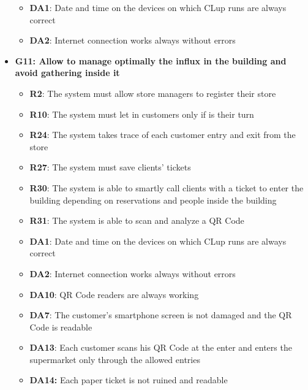 \documentclass{article}
\begin{document}
\begin{itemize}
\begin{itemize}
						\item {\bfseries DA1}: Date and time on the devices on which CLup runs are always correct
						\item {\bfseries DA2}: Internet connection works always without errors
					
					\end{itemize}

				\newpage
				
				\item {\bfseries G11: Allow to manage optimally the influx in the building and avoid gathering inside it}	

					\begin{itemize}
						
						\item {\bfseries R2}: The system must allow store managers to register their store
						\item {\bfseries R10}: The system must let in customers only if is their turn
						\item {\bfseries R24}: The system takes trace of each customer entry and exit from the store
						\item {\bfseries R27}: The system must save clients’ tickets				
						\item {\bfseries R30}: The system is able to smartly call clients with a ticket to enter the building depending on reservations and people inside the building
						\item {\bfseries R31}: The system is able to scan and analyze a QR Code \\
		
						\item {\bfseries DA1}: Date and time on the devices on which CLup runs are always correct
						\item {\bfseries DA2}: Internet connection works always without errors
						\item {\bfseries DA10}: QR Code readers are always working
						\item{\bfseries DA7}: The customer’s smartphone screen is not damaged and the QR Code is readable
						\item {\bfseries DA13}: Each customer scans his QR Code at the enter and enters the supermarket only through the allowed entries
						\item {\bfseries DA14:} Each paper ticket is not ruined and readable
					
					\end{itemize}


\end{itemize}
\end{document}
